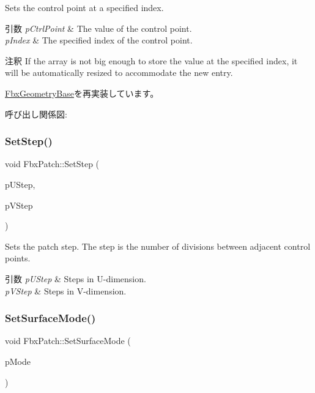 Sets the control point at a specified index. 
\begin{DoxyParams}{引数}
{\em p\+Ctrl\+Point} & The value of the control point. \\
\hline
{\em p\+Index} & The specified index of the control point.\\
\hline
\end{DoxyParams}
\begin{DoxyRemark}{注釈}
If the array is not big enough to store the value at the specified index, it will be automatically resized to accommodate the new entry. 
\end{DoxyRemark}


\hyperlink{class_fbx_geometry_base_ab2d5567b073e6b9f4feb5bb428fa99e4}{Fbx\+Geometry\+Base}を再実装しています。

呼び出し関係図\+:
\mbox{\label{class_fbx_patch_a9b1fca6dfff6bf62472528b5a12ea987}} 
\subsubsection{\texorpdfstring{Set\+Step()}{SetStep()}}
{\footnotesize\ttfamily void Fbx\+Patch\+::\+Set\+Step (\begin{DoxyParamCaption}\item[{int}]{p\+U\+Step,  }\item[{int}]{p\+V\+Step }\end{DoxyParamCaption})}

Sets the patch step. The step is the number of divisions between adjacent control points. 
\begin{DoxyParams}{引数}
{\em p\+U\+Step} & Steps in U-\/dimension. \\
\hline
{\em p\+V\+Step} & Steps in V-\/dimension. \\
\hline
\end{DoxyParams}
\mbox{\label{class_fbx_patch_abe0a63e804147816c6d6b7733b7de6dd}} 
\subsubsection{\texorpdfstring{Set\+Surface\+Mode()}{SetSurfaceMode()}}
{\footnotesize\ttfamily void Fbx\+Patch\+::\+Set\+Surface\+Mode (\begin{DoxyParamCaption}\item[{\hyperlink{class_fbx_geometry_adb9d2e34481a2cb40f1d783c665794db}{Fbx\+Geometry\+::\+E\+Surface\+Mode}}]{p\+Mode }\end{DoxyParamCaption})}

